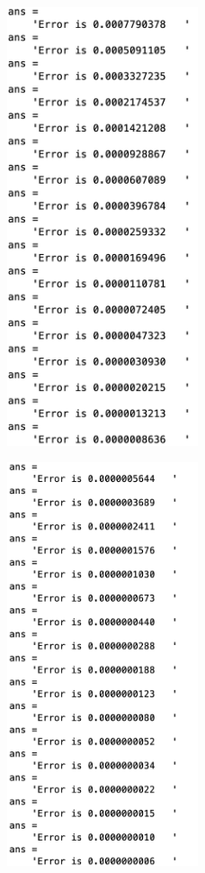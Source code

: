 \documentclass[newpage]{homework}
\begin{document}
\begin{figure}[htbp]
	\centering
	\includegraphics[width=0.5\textwidth]{3bii.png}
\end{figure}

\begin{figure}[htbp]
	\centering
	\includegraphics[width=0.5\textwidth]{3biii.png}
\end{figure}
\end{document}
